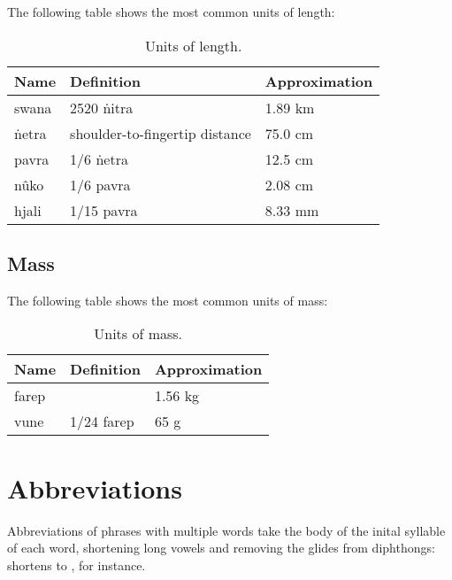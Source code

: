 \documentclass{book}
\begin{document}
The following table shows the most common units of length:

\begin{table}[h]
    \caption{Units of length.}
    \centering
    \begin{tabu} to \linewidth {|l|X|X|}
        \hline
        Name & Definition & Approximation \\
        \hline
        swana & 2520 ṅitra & 1.89 km \\
        ṅetra & shoulder-to-fingertip distance & 75.0 cm \\
        pavra & 1/6 ṅetra & 12.5 cm \\
        nûko & 1/6 pavra & 2.08 cm \\
        hjali & 1/15 pavra & 8.33 mm \\
        \hline
    \end{tabu}
\end{table}

\subsection{Mass}

The following table shows the most common units of mass:

\begin{table}[h]
    \caption{Units of mass.}
    \centering
    \begin{tabu} to \linewidth {|l|X|X|}
        \hline
        Name & Definition & Approximation \\
        \hline
        farep & & 1.56 kg \\
        vune & 1/24 farep & 65 g \\
        \hline
    \end{tabu}
\end{table}

\section{Abbreviations}

Abbreviations of phrases with multiple words take the body of the inital syllable of each word, shortening long vowels and removing the glides from diphthongs:  shortens to , for instance.

\end{document}
